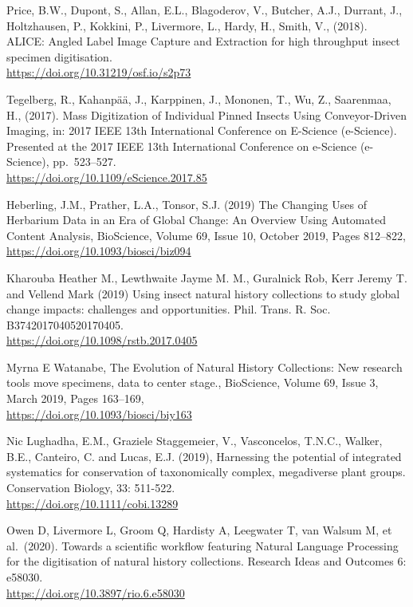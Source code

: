 \begin{thebibliography}{9}
Price, B.W., Dupont, S., Allan, E.L., Blagoderov, V., Butcher,
A.J., Durrant, J., Holtzhausen, P., Kokkini, P., Livermore, L., Hardy,
H., Smith, V., (2018). ALICE: Angled Label Image Capture and Extraction
for high throughput insect specimen digitisation.\\
\url{https://doi.org/10.31219/osf.io/s2p73}

Tegelberg, R., Kahanpää, J., Karppinen, J., Mononen, T., Wu,
Z., Saarenmaa, H., (2017). Mass Digitization of Individual Pinned
Insects Using Conveyor-Driven Imaging, in: 2017 IEEE 13th International
Conference on E-Science (e-Science). Presented at the 2017 IEEE 13th
International Conference on e-Science (e-Science), pp.~523--527.\\
\url{https://doi.org/10.1109/eScience.2017.85}

Heberling, J.M., Prather, L.A., Tonsor, S.J. (2019) The
Changing Uses of Herbarium Data in an Era of Global Change: An Overview
Using Automated Content Analysis, BioScience, Volume 69, Issue 10,
October 2019, Pages 812--822,\\
\url{https://doi.org/10.1093/biosci/biz094}

Kharouba Heather M., Lewthwaite Jayme M. M., Guralnick Rob,
Kerr Jeremy T. and Vellend Mark (2019) Using insect natural history
collections to study global change impacts: challenges and
opportunities. Phil. Trans. R. Soc. B3742017040520170405.\\
\url{https://doi.org/10.1098/rstb.2017.0405}

Myrna E Watanabe, The Evolution of Natural History Collections:
New research tools move specimens, data to center stage., BioScience,
Volume 69, Issue 3, March 2019, Pages 163--169,\\
\url{https://doi.org/10.1093/biosci/biy163}

Nic Lughadha, E.M., Graziele Staggemeier, V., Vasconcelos,
T.N.C., Walker, B.E., Canteiro, C. and Lucas, E.J. (2019), Harnessing
the potential of integrated systematics for conservation of
taxonomically complex, megadiverse plant groups. Conservation Biology,
33: 511-522.\\
\url{https://doi.org/10.1111/cobi.13289}

Owen D, Livermore L, Groom Q, Hardisty A, Leegwater T, van
Walsum M, et al.~(2020). Towards a scientific workflow featuring Natural
Language Processing for the digitisation of natural history collections.
Research Ideas and Outcomes 6: e58030.\\
\url{https://doi.org/10.3897/rio.6.e58030}


\end{thebibliography}
